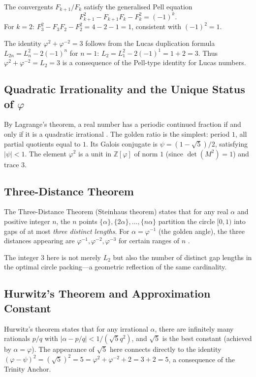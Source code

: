 The convergents $F_{k+1}/F_{k}$ satisfy the generalised Pell
equation
\[
  F_{k+1}^{2} - F_{k+1}F_{k} - F_{k}^{2} = (-1)^{k}.
\]
For $k=2$: $F_{3}^{2}-F_{3}F_{2}-F_{2}^{2} = 4 - 2 - 1 = 1$,
consistent with $(-1)^{2}=1$.

The identity $\varphi^{2}+\varphi^{-2}=3$ follows from the
Lucas duplication formula $L_{2n} = L_{n}^{2} - 2(-1)^{n}$
for $n=1$: $L_{2} = L_{1}^{2} - 2(-1)^{1} = 1 + 2 = 3$.
Thus $\varphi^{2}+\varphi^{-2} = L_{2} = 3$ is a consequence
of the Pell-type identity for Lucas numbers.

\subsection{Quadratic Irrationality and the Unique Status of $\varphi$}

By Lagrange's theorem, a real number has a periodic continued
fraction if and only if it is a quadratic irrational \cite{olds_pell}.
The golden ratio is the simplest: period $1$, all partial quotients
equal to $1$.
Its Galois conjugate is $\psi = (1-\sqrt{5})/2$, satisfying
$|\psi| < 1$.
The element $\varphi^{2}$ is a unit in $\mathbb{Z}[\varphi]$
of norm $1$ (since $\det(M^{2})=1$) and trace $3$.

\subsection{Three-Distance Theorem}

The Three-Distance Theorem (Steinhaus theorem) states that for
any real $\alpha$ and positive integer $n$, the $n$ points
$\{\alpha\}, \{2\alpha\}, \ldots, \{n\alpha\}$ partition the
circle $[0,1)$ into gaps of at most \emph{three distinct lengths}.
For $\alpha = \varphi^{-1}$ (the golden angle), the three distances
appearing are $\varphi^{-1}, \varphi^{-2}, \varphi^{-3}$ for
certain ranges of $n$ \cite{olds_pell}.

The integer $3$ here is not merely $L_{2}$ but also the number of
distinct gap lengths in the optimal circle packing---a geometric
reflection of the same cardinality.

\subsection{Hurwitz's Theorem and Approximation Constant}

Hurwitz's theorem states that for any irrational $\alpha$, there
are infinitely many rationals $p/q$ with
$|\alpha - p/q| < 1/(\sqrt{5}q^{2})$,
and $\sqrt{5}$ is the best constant (achieved by $\alpha=\varphi$).
The appearance of $\sqrt{5}$ here connects directly to the
identity $(\varphi-\psi)^{2} = (\sqrt{5})^{2} = 5 = \varphi^{2}+\varphi^{-2}+2
= 3+2 = 5$, a consequence of the Trinity Anchor.

